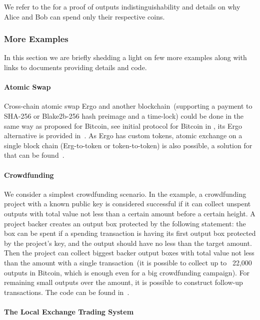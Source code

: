  We refer to the \cite{ergoAdvTutorial} for a proof of outputs indistinguishability and details on why
 Alice and Bob can spend only their respective coins.


\subsubsection{More Examples}

 In this section we are briefly shedding a light on few more examples along with links to documents providing
 details and code.

\paragraph{Atomic Swap}

Cross-chain atomic swap Ergo and another blockchain~(supporting a payment to SHA-256 or Blake2b-256 hash preimage
and a time-lock) could be done in the same way as proposed for Bitcoin, see initial protocol for Bitcoin in
\cite{Nol13}, its Ergo alternative is provided in~\cite{ergoTutorial}. As Ergo has custom tokens,
atomic exchange on a single block chain (Erg-to-token or token-to-token) is also possible, a solution for that can be
found~\cite{ergoTutorial}.

\paragraph{Crowdfunding}

 We consider a simplest crowdfunding scenario. In the example, a crowdfunding project with a known public key
 is considered successful if it
 can collect unspent outputs with total value not less than a certain amount before
 a certain height. A project backer creates an output box protected by the following statement: the box can be spent
 if a spending transaction is having its first output box protected by the project's key, and the output should have
 no less than the target amount.
 Then the project can collect biggest backer output boxes with total value not less
 than the amount with a single transaction~(it is possible to collect up to ~22,000 outputs in Bitcoin, which is
 enough even for a big crowdfunding campaign). For remaining small outputs over the amount, it is possible to
 construct follow-up transactions. The code can be found in~\cite{ergoTutorial}.

\paragraph{The Local Exchange Trading System}

